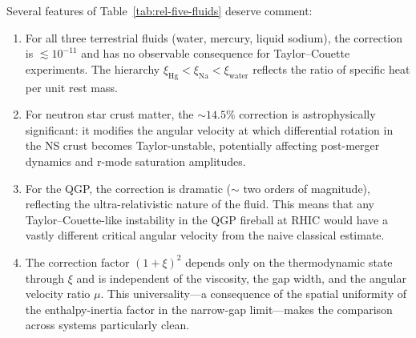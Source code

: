 \noindent
Several features of Table~\ref{tab:rel-five-fluids} deserve comment:
\begin{enumerate}
\item For all three terrestrial fluids (water, mercury, liquid sodium),
  the correction is $\lesssim 10^{-11}$ and has no observable
  consequence for Taylor--Couette experiments.  The hierarchy
  $\xi_{\mathrm{Hg}} < \xi_{\mathrm{Na}} < \xi_{\mathrm{water}}$
  reflects the ratio of specific heat per unit rest mass.

\item For neutron star crust matter, the $\sim 14.5\%$ correction is
  astrophysically significant: it modifies the angular velocity at
  which differential rotation in the NS crust becomes Taylor-unstable,
  potentially affecting post-merger dynamics and r-mode saturation
  amplitudes.

\item For the QGP, the correction is dramatic ($\sim$ two orders of
  magnitude), reflecting the ultra-relativistic nature of the fluid.
  This means that any Taylor--Couette-like instability in the QGP
  fireball at RHIC would have a vastly different critical angular
  velocity from the naive classical estimate.

\item The correction factor $(1+\xi)^{2}$ depends only on the
  thermodynamic state through $\xi$ and is independent of the
  viscosity, the gap width, and the angular velocity ratio $\mu$.
  This universality---a consequence of the spatial uniformity of
  the enthalpy-inertia factor in the narrow-gap limit---makes the
  comparison across systems particularly clean.
\end{enumerate}

